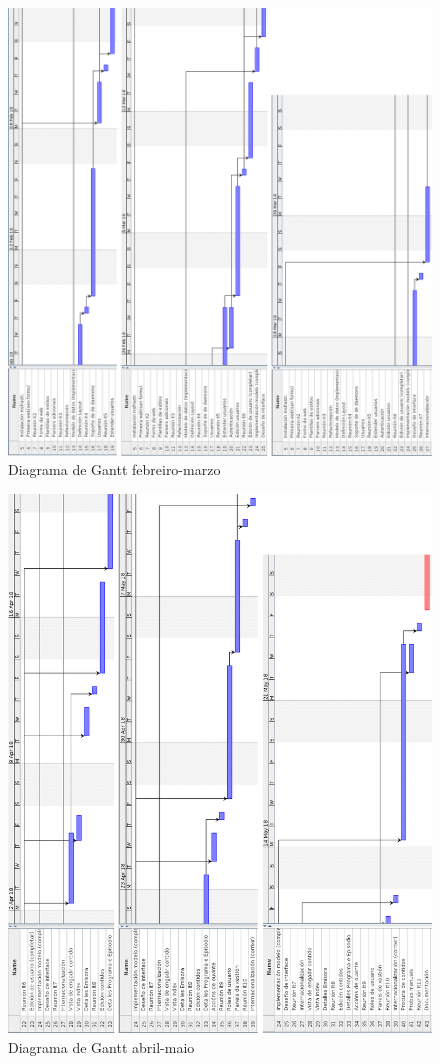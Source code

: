 \begin{figure}[H]
	\centering
	\includegraphics[scale=0.35,keepaspectratio=true]{./images/gantt/gc2.png}
	\caption{Diagrama de Gantt febreiro-marzo}
\end{figure}

\begin{figure}[H]
	\centering
	\includegraphics[scale=0.40,keepaspectratio=true]{./images/gantt/gc3.png}
	\caption{Diagrama de Gantt abril-maio}
\end{figure}

